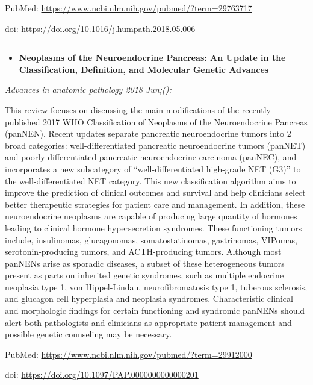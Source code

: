 \documentclass[]{article}
\providecommand{\tightlist}{%
  \setlength{\itemsep}{0pt}\setlength{\parskip}{0pt}}
\begin{document}
PubMed: \url{https://www.ncbi.nlm.nih.gov/pubmed/?term=29763717}

doi: \url{https://doi.org/10.1016/j.humpath.2018.05.006}

{}

{}

\begin{center}\rule{0.5\linewidth}{\linethickness}\end{center}

\begin{itemize}
\tightlist
\item
  \textbf{Neoplasms of the Neuroendocrine Pancreas: An Update in the
  Classification, Definition, and Molecular Genetic Advances}
\end{itemize}

\emph{Advances in anatomic pathology 2018 Jun;():}

This review focuses on discussing the main modifications of the recently
published 2017 WHO Classification of Neoplasms of the Neuroendocrine
Pancreas (panNEN). Recent updates separate pancreatic neuroendocrine
tumors into 2 broad categories: well-differentiated pancreatic
neuroendocrine tumors (panNET) and poorly differentiated pancreatic
neuroendocrine carcinoma (panNEC), and incorporates a new subcategory of
``well-differentiated high-grade NET (G3)'' to the well-differentiated
NET category. This new classification algorithm aims to improve the
prediction of clinical outcomes and survival and help clinicians select
better therapeutic strategies for patient care and management. In
addition, these neuroendocrine neoplasms are capable of producing large
quantity of hormones leading to clinical hormone hypersecretion
syndromes. These functioning tumors include, insulinomas, glucagonomas,
somatostatinomas, gastrinomas, VIPomas, serotonin-producing tumors, and
ACTH-producing tumors. Although most panNENs arise as sporadic diseases,
a subset of these heterogeneous tumors present as parts on inherited
genetic syndromes, such as multiple endocrine neoplasia type 1, von
Hippel-Lindau, neurofibromatosis type 1, tuberous sclerosis, and
glucagon cell hyperplasia and neoplasia syndromes. Characteristic
clinical and morphologic findings for certain functioning and syndromic
panNENs should alert both pathologists and clinicians as appropriate
patient management and possible genetic counseling may be necessary.

PubMed: \url{https://www.ncbi.nlm.nih.gov/pubmed/?term=29912000}

doi: \url{https://doi.org/10.1097/PAP.0000000000000201}
\end{document}
